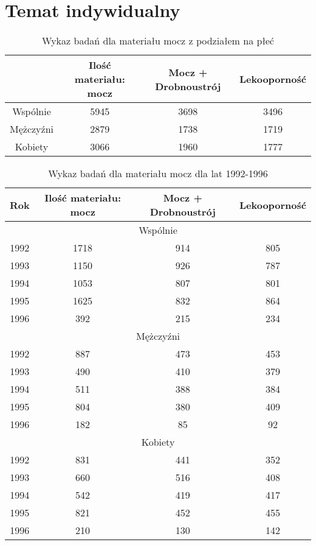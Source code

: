 \documentclass[a4paper,11pt]{article}
\begin{document}
\newpage
\section{Temat indywidualny}

\begin{table}[H]
  \begin{center}
  \caption{Wykaz badań dla materiału mocz z podziałem na płeć}
  \begin{tabular}{|c|c|c|c|}
  \hline
  &Ilość materiału: mocz & Mocz + Drobnoustrój & Lekooporność \\ \hline
  Wspólnie &5945 &3698 &3496\\ \hline
Mężczyźni &2879 &1738 &1719\\ \hline
Kobiety &3066 &1960 &1777\\ \hline
  \end{tabular}
\end{center}
\end{table}

\begin{table}[H]
  \begin{center}
  \caption{Wykaz badań dla materiału mocz dla lat 1992-1996}
  \begin{tabular}{|c|c|c|c|}
  \hline
  Rok & Ilość materiału: mocz & Mocz + Drobnoustrój & Lekooporność \\ \hline 
  
\multicolumn{4}{|c|}{Wspólnie} \\ \hline
1992 &1718 &914 &805\\ \hline
1993 &1150 &926 &787\\ \hline
1994 &1053 &807 &801\\ \hline
1995 &1625 &832 &864\\ \hline
1996 &392 &215 &234\\ \hline



\multicolumn{4}{|c|}{Mężczyźni} \\ \hline
1992 &887 &473 &453\\ \hline
1993 &490 &410 &379\\ \hline
1994 &511 &388 &384\\ \hline
1995 &804 &380 &409\\ \hline
1996 &182 &85 &92\\ \hline



\multicolumn{4}{|c|}{Kobiety} \\ \hline
1992 &831 &441 &352\\ \hline
1993 &660 &516 &408\\ \hline
1994 &542 &419 &417\\ \hline
1995 &821 &452 &455\\ \hline
1996 &210 &130 &142\\ \hline
\end{tabular}
\end{center}
\end{table}
\end{document}
